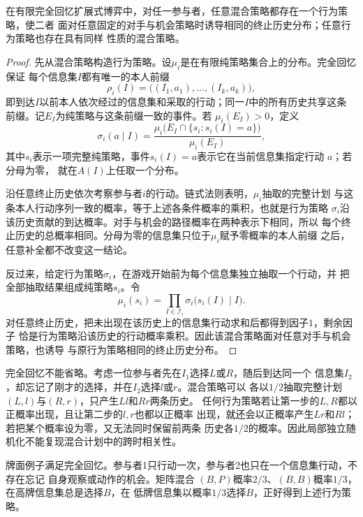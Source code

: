 \begin{theorem}[Kuhn实现等价]
\label{thm:game-kuhn-equivalence}
在有限完全回忆扩展式博弈中，对任一参与者，任意混合策略都存在一个行为策略，使二者
面对任意固定的对手与机会策略时诱导相同的终止历史分布；任意行为策略也存在具有同样
性质的混合策略。
\end{theorem}

\begin{proof}
先从混合策略构造行为策略。设\(\mu_i\)是在有限纯策略集合上的分布。完全回忆保证
每个信息集\(I\)都有唯一的本人前缀
\[
  \rho_i(I)
  =
  \bigl((I_1,a_1),\ldots,(I_k,a_k)\bigr),
\]
即到达\(I\)以前本人依次经过的信息集和采取的行动；同一\(I\)中的所有历史共享这条
前缀。记\(E_I\)为纯策略与这条前缀一致的事件。若
\(\mu_i(E_I)>0\)，定义
\[
  \sigma_i(a\mid I)
  =
  \frac{
    \mu_i\bigl(E_I\cap\{s_i:s_i(I)=a\}\bigr)
  }{
    \mu_i(E_I)
  },
\]
其中\(s_i\)表示一项完整纯策略，事件\(s_i(I)=a\)表示它在当前信息集指定行动
\(a\)；若分母为零，
就在\(A(I)\)上任取一个分布。

沿任意终止历史依次考察参与者\(i\)的行动。链式法则表明，\(\mu_i\)抽取的完整计划
与这条本人行动序列一致的概率，等于上述各条件概率的乘积，也就是行为策略
\(\sigma_i\)沿该历史贡献的到达概率。对手与机会的路径概率在两种表示下相同，所以
每个终止历史的总概率相同。分母为零的信息集只位于\(\mu_i\)赋予零概率的本人前缀
之后，任意补全都不改变这一结论。

反过来，给定行为策略\(\sigma_i\)，在游戏开始前为每个信息集独立抽取一个行动，并
把全部抽取结果组成纯策略\(s_i\)。令
\[
  \mu_i(s_i)
  =
  \prod_{I\in\mathcal{I}_i}
  \sigma_i\bigl(s_i(I)\mid I\bigr).
\]
对任意终止历史，把未出现在该历史上的信息集行动求和后都得到因子\(1\)，剩余因子
恰是行为策略沿该历史的行动概率乘积。因此该混合策略面对任意对手与机会策略，也诱导
与原行为策略相同的终止历史分布。
\end{proof}

完全回忆不能省略。考虑一位参与者先在\(I_1\)选择\(L\)或\(R\)，随后到达同一个
信息集\(I_2\)，却忘记了刚才的选择，并在\(I_2\)选择\(l\)或\(r\)。混合策略可以
各以\(1/2\)抽取完整计划\((L,l)\)与\((R,r)\)，只产生\(Ll\)和\(Rr\)两条历史。
任何行为策略若让第一步的\(L,R\)都以正概率出现，且让第二步的\(l,r\)也都以正概率
出现，就还会以正概率产生\(Lr\)和\(Rl\)；若把某个概率设为零，又无法同时保留前两条
历史各\(1/2\)的概率。因此局部独立随机化不能复现混合计划中的跨时相关性。

牌面例子满足完全回忆。参与者1只行动一次，参与者2也只在一个信息集行动，不存在忘记
自身观察或动作的机会。矩阵混合
\((B,P)\)概率\(2/3\)、\((B,B)\)概率\(1/3\)，在高牌信息集总是选择\(B\)，在
低牌信息集以概率\(1/3\)选择\(B\)，正好得到上述行为策略。

